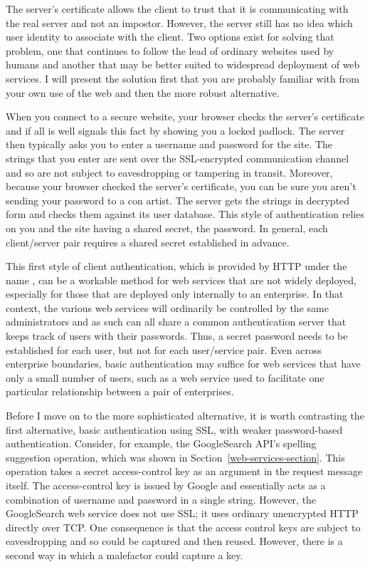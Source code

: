 The server's certificate allows the client to trust that it is
communicating with the real server and not an impostor.  However, the
server still has no idea which user identity to associate with the
client.  Two options exist for solving that problem, one that
continues to follow the lead of ordinary websites used by humans and
another that may be better suited to widespread deployment of web
services.  I will present the solution first that you are probably
familiar with from your own use of the web and then the more robust
alternative.

When you connect to a secure website, your browser checks the
server's certificate and if all is well signals this fact by showing
you a locked padlock.  The server then typically asks you to enter a
username and password for the site.  The strings that you enter are
sent over the SSL-encrypted communication channel and so are not
subject to eavesdropping or tampering in transit.  Moreover, because
your browser checked the server's certificate, you can be sure you
aren't sending your password to a con artist.  The server gets the
strings in decrypted form and checks them against its user database.
This style of authentication relies on you and the site having a
shared secret, the password.  In general, each client/server pair
requires a shared secret established in advance.

This first style of client authentication, which is provided by HTTP
under the name , can be a workable method for web
services that are not widely deployed, especially for those that are
deployed only internally to an enterprise.  In that context, the
various web services will ordinarily be controlled by the same
administrators and as such can all share a common authentication
server that keeps track of users
with their passwords.  Thus, a secret password needs to be established
for each user, but not for each user/service pair.  Even across
enterprise boundaries, basic authentication may suffice for web
services that have only a small number of users, such as a web service
used to facilitate one particular relationship between a pair of
enterprises.

Before I move on to the more sophisticated alternative, it is worth
contrasting the first alternative, basic authentication using SSL,
with weaker password-based authentication.  Consider, for example, the
GoogleSearch API's spelling suggestion operation, which was shown in
Section~\ref{web-services-section}.  This operation takes a secret
access-control key as an argument in the request message itself.  The
access-control key is issued by Google and essentially acts as a
combination of username and password in a single string.  However, the
GoogleSearch web service does not use SSL; it uses ordinary unencrypted
HTTP directly over TCP.  One consequence is that the access control
keys are subject to eavesdropping and so could be captured and then
reused.  However, there is a second way in which a malefactor could
capture a key.


